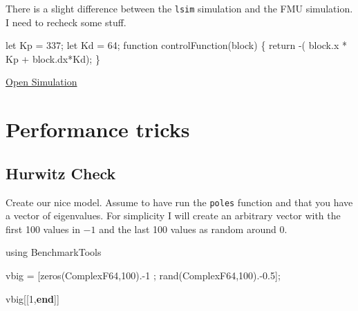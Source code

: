 \documentclass[
  8pt,
  a4paper,
]{book}
\newenvironment{Shaded}{\begin{snugshade}}{\end{snugshade}}
\newcommand{\BuiltInTok}[1]{\textcolor[rgb]{0.00,0.23,0.31}{#1}}
\newcommand{\DataTypeTok}[1]{\textcolor[rgb]{0.68,0.00,0.00}{#1}}
\newcommand{\FloatTok}[1]{\textcolor[rgb]{0.68,0.00,0.00}{#1}}
\newcommand{\FunctionTok}[1]{\textcolor[rgb]{0.28,0.35,0.67}{#1}}
\newcommand{\ImportTok}[1]{\textcolor[rgb]{0.00,0.46,0.62}{#1}}
\newcommand{\KeywordTok}[1]{\textcolor[rgb]{0.00,0.23,0.31}{\textbf{#1}}}
\newcommand{\NormalTok}[1]{\textcolor[rgb]{0.00,0.23,0.31}{#1}}
\newcommand{\OperatorTok}[1]{\textcolor[rgb]{0.37,0.37,0.37}{#1}}
\begin{document}
There is a slight difference between the \texttt{lsim} simulation and
the FMU simulation. I need to recheck some stuff.

\begin{Shaded}
\begin{Highlighting}[]
\NormalTok{let Kp = 337;}
\NormalTok{let Kd = 64;}
\NormalTok{function controlFunction(block)}
\NormalTok{\{}
\NormalTok{  return {-}( block.x * Kp + block.dx*Kd);}
\NormalTok{\}}
\end{Highlighting}
\end{Shaded}

\href{https://pages.icpmol.es/ControlChallenges/index.html?target=TutorialBlockWithFriction&code=bGV0IEtwID0gMzM3OwpsZXQgS2QgPSA2NDsKZnVuY3Rpb24gY29udHJvbEZ1bmN0aW9uKGJsb2NrKQp7CiAgcmV0dXJuIC0oIGJsb2NrLnggKiBLcCArIGJsb2NrLmR4KktkKTsKfQ==}{Open
Simulation}

\cleardoublepage
{}
{}
\appendix

\chapter{Performance tricks}\label{performance-tricks}

\section{Hurwitz Check}\label{hurwitz-check}

Create our nice model. Assume to have run the \texttt{poles} function
and that you have a vector of eigenvalues. For simplicity I will create
an arbitrary vector with the first 100 values in \(-1\) and the last 100
values as random around \(0\).

\begin{Shaded}
\begin{Highlighting}[]
\ImportTok{using} \BuiltInTok{BenchmarkTools}

\NormalTok{vbig }\OperatorTok{=}\NormalTok{ [}\FunctionTok{zeros}\NormalTok{(}\DataTypeTok{ComplexF64}\NormalTok{,}\FloatTok{100}\NormalTok{)}\OperatorTok{.{-}}\FloatTok{1}\NormalTok{ ; }\FunctionTok{rand}\NormalTok{(}\DataTypeTok{ComplexF64}\NormalTok{,}\FloatTok{100}\NormalTok{)}\OperatorTok{.{-}}\FloatTok{0.5}\NormalTok{];}

\NormalTok{vbig[[}\FloatTok{1}\NormalTok{,}\KeywordTok{end}\NormalTok{]]}
\end{Highlighting}
\end{Shaded}
\end{document}
